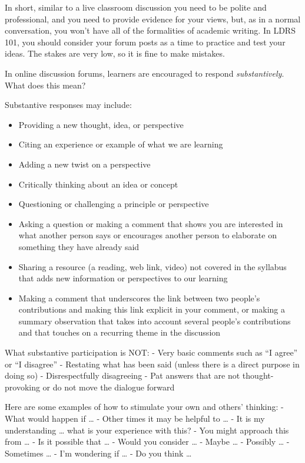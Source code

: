 \documentclass[
  letterpaper,
  DIV=11,
  numbers=noendperiod]{scrreprt}
\providecommand{\tightlist}{%
  \setlength{\itemsep}{0pt}\setlength{\parskip}{0pt}}\usepackage{longtable,booktabs,array}
\begin{document}
In short, similar to a live classroom discussion you need to be polite
and professional, and you need to provide evidence for your views, but,
as in a normal conversation, you won't have all of the formalities of
academic writing. In LDRS 101, you should consider your forum posts as a
time to practice and test your ideas. The stakes are very low, so it is
fine to make mistakes.

In online discussion forums, learners are encouraged to respond
\emph{substantively}. What does this mean?

Substantive responses may include:

\begin{itemize}
\tightlist
\item
  Providing a new thought, idea, or perspective
\item
  Citing an experience or example of what we are learning
\item
  Adding a new twist on a perspective
\item
  Critically thinking about an idea or concept
\item
  Questioning or challenging a principle or perspective
\item
  Asking a question or making a comment that shows you are interested in
  what another person says or encourages another person to elaborate on
  something they have already said
\item
  Sharing a resource (a reading, web link, video) not covered in the
  syllabus that adds new information or perspectives to our learning
\item
  Making a comment that underscores the link between two people's
  contributions and making this link explicit in your comment, or making
  a summary observation that takes into account several people's
  contributions and that touches on a recurring theme in the discussion
\end{itemize}

What substantive participation is NOT: - Very basic comments such as ``I
agree'' or ``I disagree'' - Restating what has been said (unless there
is a direct purpose in doing so) - Disrespectfully disagreeing - Pat
answers that are not thought-provoking or do not move the dialogue
forward

Here are some examples of how to stimulate your own and others'
thinking: - What would happen if \ldots{} - Other times it may be
helpful to \ldots{} - It is my understanding \ldots{} what is your
experience with this? - You might approach this from \ldots{} - Is it
possible that \ldots{} - Would you consider \ldots{} - Maybe \ldots{} -
Possibly \ldots{} - Sometimes \ldots{} - I'm wondering if \ldots{} - Do
you think \ldots{}
\end{document}
